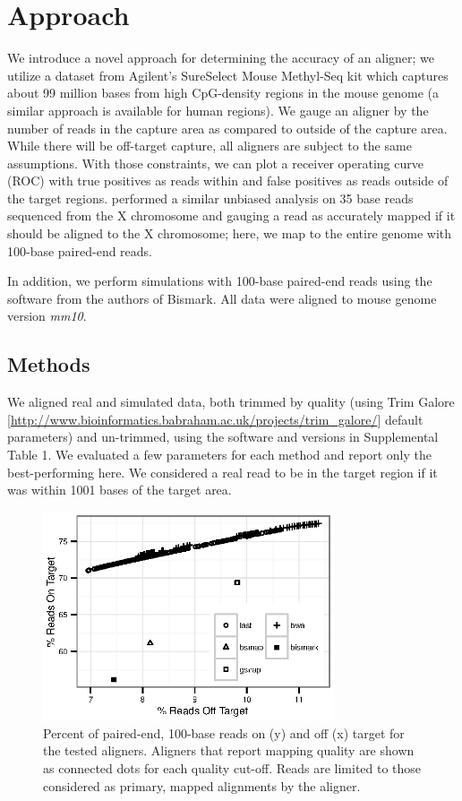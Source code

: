 \documentclass{bioinfo}
\begin{document}
\section{Approach}
We introduce a novel approach for determining the accuracy of an aligner;
we utilize a dataset from Agilent's SureSelect Mouse Methyl-Seq kit which
captures about
99 million bases from high CpG-density regions in the mouse genome (a similar
approach is available for human regions).
We gauge an aligner by the number of reads in the capture area as compared
to outside of the capture area. While there will be off-target capture, all
aligners are subject to the same assumptions. With those constraints, we can
plot a receiver operating curve (ROC) with true positives as reads within
and false positives as reads outside of the target regions.
\citealp{shrestha} performed a similar unbiased analysis on 35 base reads sequenced from
the X chromosome and gauging a read as accurately mapped if it should be aligned
to the X chromosome; here, we map to the entire genome with 100-base paired-end reads.

In addition, we perform simulations with 100-base paired-end reads using
the software from the authors of Bismark. All data were aligned to mouse
genome version \textit{mm10}.


\begin{methods}
\section{Methods}
We aligned real and simulated data, both trimmed by quality (using Trim Galore
[\href{http://www.bioinformatics.babraham.ac.uk/projects/trim\_galore/}{http://www.bioinformatics.babraham.ac.uk/projects/trim\_galore/}] default parameters) and un-trimmed, using the software and versions in Supplemental Table 1.
We evaluated a few parameters for each method and report only the
best-performing here.
We considered a real read to be in the target region if it
was within 1001 bases of the target area. 

\end{methods}

\begin{figure}[!tpb]%
    \centerline{\includegraphics[width=86mm]{qual-plot-real}}
    \caption{Percent of paired-end, 100-base reads on (y) and off (x) target for the tested aligners. Aligners that report mapping quality are shown as connected dots for each quality cut-off. Reads are limited to those considered as primary, mapped alignments by the aligner.}\label{fig:01}
\end{figure}
\end{document}
